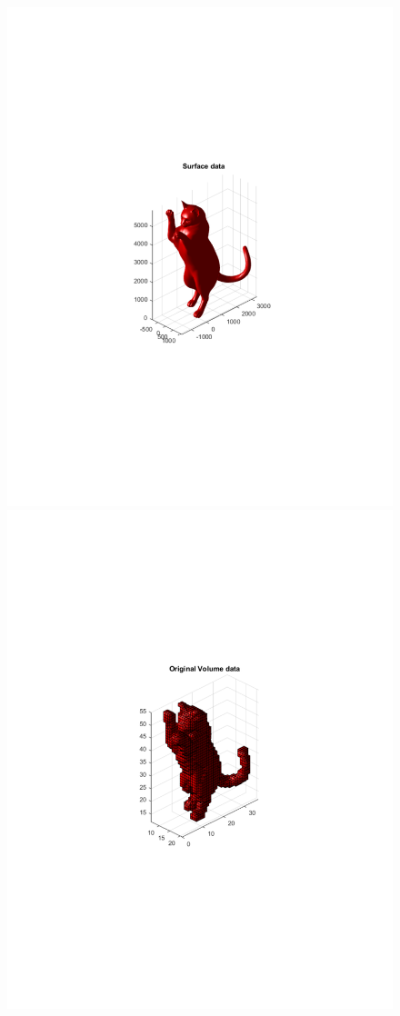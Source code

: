 \documentclass{UCF_ETD}
\begin{document}
 \begin{figure}[H]
 \begin{center}
 \includegraphics[scale=0.7]{PolarSphericalDFT/ThreeDOriginalSurfaceLikeData}
 \includegraphics[scale=0.7]{PolarSphericalDFT/ThreeDOriginalVoxelData}

\end{center}
\end{figure}
\end{document}
